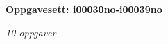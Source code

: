 \centerline{\bf Oppgavesett: i00030no-i00039no}
\vskip 10pt
\centerline{\it 10 oppgaver}\vskip 10pt
\vskip 10pt
